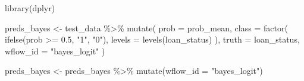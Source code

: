 \documentclass[
  letterpaper,
  DIV=11,
  numbers=noendperiod]{scrartcl}
\newenvironment{Shaded}{\begin{snugshade}}{\end{snugshade}}
\newcommand{\AttributeTok}[1]{\textcolor[rgb]{0.40,0.45,0.13}{#1}}
\newcommand{\FloatTok}[1]{\textcolor[rgb]{0.68,0.00,0.00}{#1}}
\newcommand{\FunctionTok}[1]{\textcolor[rgb]{0.28,0.35,0.67}{#1}}
\newcommand{\NormalTok}[1]{\textcolor[rgb]{0.00,0.23,0.31}{#1}}
\newcommand{\OtherTok}[1]{\textcolor[rgb]{0.00,0.23,0.31}{#1}}
\newcommand{\SpecialCharTok}[1]{\textcolor[rgb]{0.37,0.37,0.37}{#1}}
\newcommand{\StringTok}[1]{\textcolor[rgb]{0.13,0.47,0.30}{#1}}
\begin{document}
\begin{Shaded}
\end{Shaded}

\begin{Shaded}
\begin{Highlighting}[]
\FunctionTok{library}\NormalTok{(dplyr)}

\NormalTok{preds\_bayes }\OtherTok{\textless{}{-}}\NormalTok{ test\_data }\SpecialCharTok{\%\textgreater{}\%}
  \FunctionTok{mutate}\NormalTok{(}
    \AttributeTok{prob =}\NormalTok{ prob\_mean,}
    \AttributeTok{class =} \FunctionTok{factor}\NormalTok{(}
      \FunctionTok{ifelse}\NormalTok{(prob }\SpecialCharTok{\textgreater{}=} \FloatTok{0.5}\NormalTok{, }\StringTok{"1"}\NormalTok{, }\StringTok{"0"}\NormalTok{),}
      \AttributeTok{levels =} \FunctionTok{levels}\NormalTok{(loan\_status)}
\NormalTok{    ),}
    \AttributeTok{truth =}\NormalTok{ loan\_status,}
    \AttributeTok{wflow\_id =} \StringTok{"bayes\_logit"}
\NormalTok{  )}

\NormalTok{preds\_bayes }\OtherTok{\textless{}{-}}\NormalTok{ preds\_bayes }\SpecialCharTok{\%\textgreater{}\%}
  \FunctionTok{mutate}\NormalTok{(}\AttributeTok{wflow\_id =} \StringTok{"bayes\_logit"}\NormalTok{)}
\end{Highlighting}
\end{Shaded}
\end{document}
